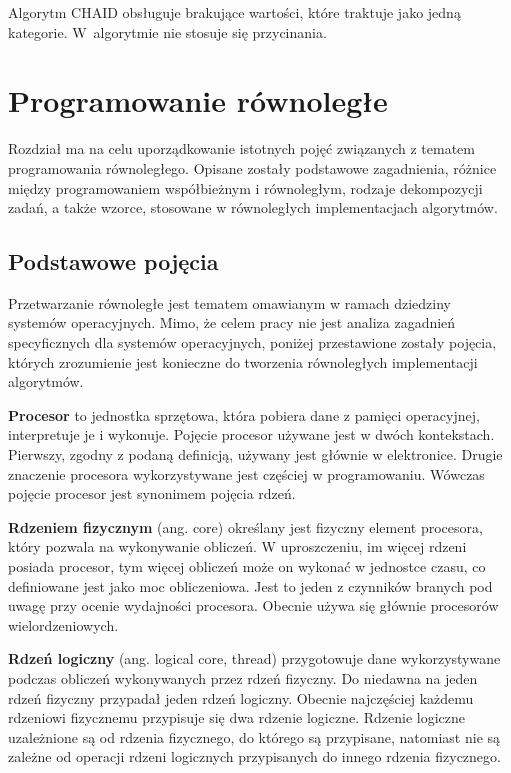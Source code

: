 \documentclass[12pt]{article}
\begin{document}
Algorytm CHAID obsługuje brakujące wartości, które traktuje jako jedną kategorie. W~algorytmie nie stosuje się przycinania.

\newpage
\section{Programowanie równoległe}
Rozdział ma na celu uporządkowanie istotnych pojęć związanych z tematem programowania
równoległego. Opisane zostały podstawowe zagadnienia, różnice między programowaniem współbieżnym
i równoległym, rodzaje dekompozycji zadań, a także wzorce, stosowane w równoległych 
implementacjach algorytmów.

\subsection{Podstawowe pojęcia}
Przetwarzanie równoległe jest tematem omawianym w ramach dziedziny systemów operacyjnych.
Mimo, że celem pracy nie jest analiza zagadnień specyficznych dla systemów operacyjnych,
poniżej przestawione zostały pojęcia, których zrozumienie jest konieczne do tworzenia 
równoległych implementacji algorytmów.

\textbf{Procesor} to jednostka sprzętowa, która pobiera dane z pamięci operacyjnej, interpretuje je
i wykonuje. Pojęcie procesor używane jest w dwóch kontekstach. Pierwszy, zgodny z podaną definicją, używany
jest głównie w elektronice. Drugie znaczenie procesora wykorzystywane jest częściej w programowaniu.
Wówczas pojęcie procesor jest synonimem pojęcia rdzeń.

\textbf{Rdzeniem fizycznym} (ang. core) określany jest fizyczny element procesora, który pozwala na wykonywanie obliczeń.
W uproszczeniu, im więcej rdzeni posiada procesor, tym więcej obliczeń może on wykonać w jednostce czasu, co definiowane
jest jako moc obliczeniowa. Jest to jeden z czynników branych pod uwagę przy ocenie wydajności procesora. Obecnie używa się
głównie procesorów wielordzeniowych.

\textbf{Rdzeń logiczny} (ang. logical core, thread) przygotowuje dane wykorzystywane podczas obliczeń wykonywanych przez rdzeń fizyczny.
Do niedawna na jeden rdzeń fizyczny przypadał jeden rdzeń logiczny.
Obecnie najczęściej każdemu rdzeniowi fizycznemu przypisuje się dwa rdzenie logiczne.
Rdzenie logiczne uzależnione są od rdzenia fizycznego, do którego są przypisane, natomiast nie są zależne
od operacji rdzeni logicznych przypisanych do innego rdzenia fizycznego.
\end{document}
